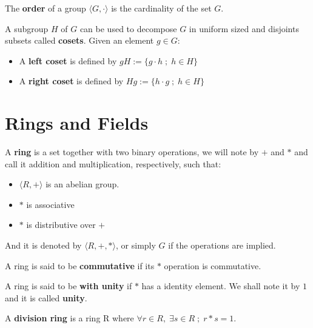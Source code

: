\documentclass[Ingles]{ic-tese-v3}
\begin{document}
\begin{definition}
  The \textbf{order} of a group $\langle G,\cdot\rangle$ is the cardinality of the set $G$.
\end{definition}

\begin{definition}
  A subgroup $H$ of $G$ can be used to decompose $G$ in uniform sized and
  disjoints subsets called \textbf{cosets}. Given an element $g \in G$:
  \begin{itemize}
  \item A \textbf{left coset} is defined by $gH := \{g\cdot h \; ; \; h \in H\}$
  \item A \textbf{right coset} is defined by $Hg := \{h\cdot g \; ; \; h \in H\}$
  \end{itemize}
\end{definition}

\section{Rings and Fields}
\label{sec:org53d70b3}

   \begin{definition}
  A \textbf{ring} is a set together with two binary operations, we will note by
  $+$ and $*$ and call it addition and multiplication, respectively, such that:
  \begin{itemize}
  \item $\langle R,+\rangle$ is an abelian group.
  \item $*$ is associative
  \item $*$ is distributive over $+$
  \end{itemize}

  And it is denoted by $\langle R,+,*\rangle$, or simply $G$ if the operations are implied.
\end{definition}

\begin{definition}
  A ring is said to be \textbf{commutative} if its $*$ operation is commutative.
\end{definition}

\begin{definition}
  A ring is said to be \textbf{with unity} if $*$ has a identity element. We
  shall note it by $1$ and it is called \textbf{unity}.

\end{definition}

\begin{definition}
  A \textbf{division ring} is a ring R where $\forall r \in R, \; \exists s \in R \; ; \; r*s = 1$.
\end{definition}
\end{document}
